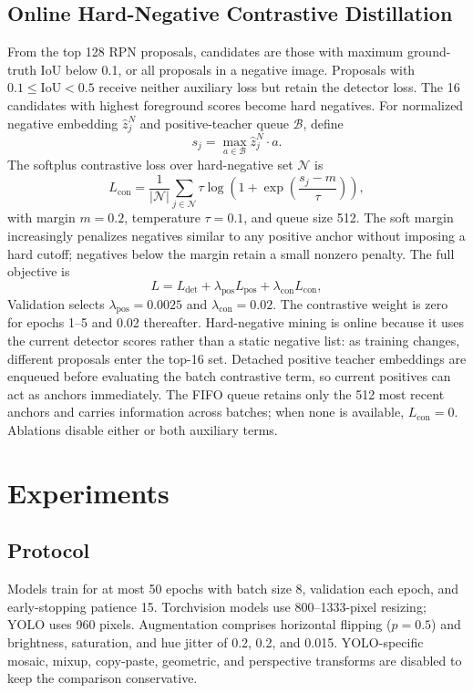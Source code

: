 \documentclass[conference,a4paper]{IEEEtran}
\begin{document}
\subsection{Online Hard-Negative Contrastive Distillation}
From the top 128 RPN proposals, candidates are those with maximum ground-truth IoU below 0.1, or all proposals in a negative image. Proposals with $0.1\leq\mathrm{IoU}<0.5$ receive neither auxiliary loss but retain the detector loss. The 16 candidates with highest foreground scores become hard negatives. For normalized negative embedding $\hat{z}^{N}_{j}$ and positive-teacher queue $\mathcal{B}$, define
\begin{equation}
s_j = \max_{a \in \mathcal{B}} \hat{z}^{N}_{j} \cdot a .
\end{equation}
The softplus contrastive loss over hard-negative set $\mathcal{N}$ is
\begin{equation}
L_{\mathrm{con}} =
\frac{1}{|\mathcal{N}|}\sum_{j \in \mathcal{N}}
\tau \log\left(1 + \exp\left(\frac{s_j - m}{\tau}\right)\right),
\end{equation}
with margin $m=0.2$, temperature $\tau=0.1$, and queue size 512. The soft margin increasingly penalizes negatives similar to any positive anchor without imposing a hard cutoff; negatives below the margin retain a small nonzero penalty. The full objective is
\begin{equation}
L = L_{\mathrm{det}} + \lambda_{\mathrm{pos}}L_{\mathrm{pos}} + \lambda_{\mathrm{con}}L_{\mathrm{con}},
\end{equation}
Validation selects $\lambda_{\mathrm{pos}}=0.0025$ and $\lambda_{\mathrm{con}}=0.02$. The contrastive weight is zero for epochs 1--5 and 0.02 thereafter. Hard-negative mining is online because it uses the current detector scores rather than a static negative list: as training changes, different proposals enter the top-16 set. Detached positive teacher embeddings are enqueued before evaluating the batch contrastive term, so current positives can act as anchors immediately. The FIFO queue retains only the 512 most recent anchors and carries information across batches; when none is available, $L_{\mathrm{con}}=0$. Ablations disable either or both auxiliary terms.

\section{Experiments}
\subsection{Protocol}
Models train for at most 50 epochs with batch size 8, validation each epoch, and early-stopping patience 15. Torchvision models use 800--1333-pixel resizing; YOLO uses 960 pixels. Augmentation comprises horizontal flipping ($p=0.5$) and brightness, saturation, and hue jitter of 0.2, 0.2, and 0.015. YOLO-specific mosaic, mixup, copy-paste, geometric, and perspective transforms are disabled to keep the comparison conservative.
\end{document}
